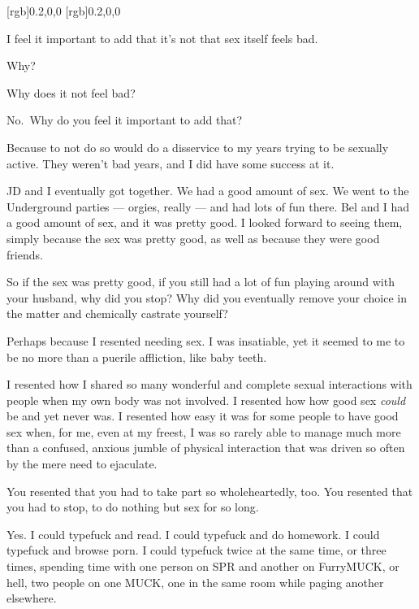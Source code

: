 [rgb]{0.2,0,0}
[rgb]{0.2,0,0}
\begin{paracol}{2}
  \begin{rightcolumn*}
    
  \end{rightcolumn*}
  \begin{leftcolumn}
\noindent I feel it important to add that it's not that sex itself feels bad.

\begin{ally}
Why?
\end{ally}
Why does it not feel bad?

\begin{ally}
No.~Why do you feel it important to add that?
\end{ally}
Because to not do so would do a disservice to my years trying to be sexually active. They weren't bad years, and I did have some success at it.

JD and I eventually got together. We had a good amount of sex. We went to the Underground parties --- orgies, really --- and had lots of fun there. Bel and I had a good amount of sex, and it was pretty good. I looked forward to seeing them, simply because the sex was pretty good, as well as because they were good friends.

\begin{ally}
So if the sex was pretty good, if you still had a lot of fun playing around with your husband, why did you stop? Why did you eventually remove your choice in the matter and chemically castrate yourself?
\end{ally}
Perhaps because I resented needing sex. I was insatiable, yet it seemed to me to be no more than a puerile affliction, like baby teeth.

I resented how I shared so many wonderful and complete sexual interactions with people when my own body was not involved. I resented how how good sex \emph{could} be and yet never was. I resented how easy it was for some people to have good sex when, for me, even at my freest, I was so rarely able to manage much more than a confused, anxious jumble of physical interaction that was driven so often by the mere need to ejaculate.

\begin{ally}
You resented that you had to take part so wholeheartedly, too. You resented that you had to stop, to do nothing but sex for so long.
\end{ally}
Yes. I could typefuck and read. I could typefuck and do homework. I could typefuck and browse porn. I could typefuck twice at the same time, or three times, spending time with one person on SPR and another on FurryMUCK, or hell, two people on one MUCK, one in the same room while paging another elsewhere.


\end{leftcolumn}
\end{paracol}
